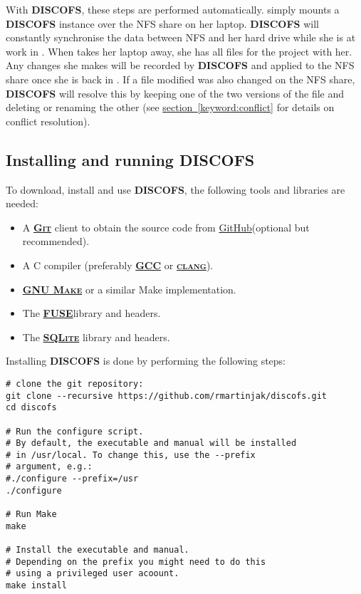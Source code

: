 \documentclass[a4paper]{article}
\newcommand{\software}[1]{\textsc{\textbf{#1}}\xspace}
\newcommand{\discofs}{\software{DISCOFS}}
\newcommand{\fuse}{\href{http://fuse.sourceforge.net/}{\software{FUSE}\xspace}}
\newcommand{\git}{\href{http://git-scm.com/}{\software{Git}}\xspace}
\newcommand{\sqlite}{\href{http://sqlite.org/}{\software{SQLite}}\xspace}
\newcommand{\github}{\href{https://github.com}{GitHub}\xspace}
\newcommand{\sectionref}[1]{\hyperref[#1]{section~\ref{#1}}}
\begin{document}
With \discofs, these steps are performed automatically. \somename simply mounts
a \discofs instance over the NFS share on her laptop. \discofs will constantly
synchronise the data between NFS and her hard drive while she is at work in
\sometown.
When \somename takes her laptop away, she has all files for the project with
her. Any changes she makes will be recorded by \discofs and applied to the NFS
share once she is back in \sometown. If a file \somename modified was also
changed on the NFS share, \discofs will resolve this by keeping one of the two
versions of the file and deleting or renaming the other (see
\sectionref{keyword:conflict} for details on conflict resolution).

\subsection{Installing and running \discofs} %

To download, install and use \discofs, the following tools and libraries are
needed:

\begin{itemize}
	\item A \git client to obtain the source code from \github (optional but
		recommended).
	\item A C compiler (preferably
		\href{http://gnu.org/software/gcc}{\software{GCC}}
		or
		\href{http://clang.llvm.org/}{\software{clang}}).
	\item \href{http://gnu.org/software/make}{\software{GNU Make}} or a
		similar Make implementation.
	\item The \fuse library and headers.
	\item The \sqlite library and headers.
\end{itemize}


Installing \discofs is done by performing the following steps:

\lstset{language=bash}
\begin{lstlisting}[deletekeywords={cd},]
# clone the git repository:
git clone --recursive https://github.com/rmartinjak/discofs.git
cd discofs

# Run the configure script.
# By default, the executable and manual will be installed
# in /usr/local. To change this, use the --prefix
# argument, e.g.:
#./configure --prefix=/usr
./configure

# Run Make
make

# Install the executable and manual.
# Depending on the prefix you might need to do this
# using a privileged user acoount.
make install
\end{lstlisting}
\end{document}

